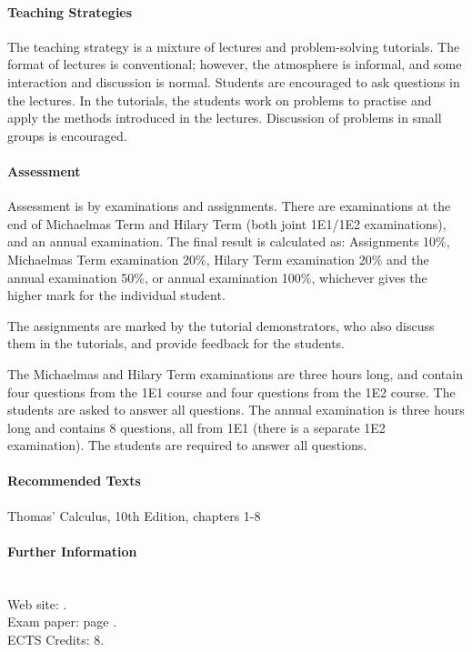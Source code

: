 \paragraph{Teaching Strategies}
The teaching strategy is a mixture of lectures and problem-solving tutorials. The format of lectures is conventional;
however, the atmosphere is informal, and some interaction and discussion is normal. Students are encouraged to ask
questions in the lectures. In the tutorials, the students work on problems to practise and apply the methods introduced
in the lectures. Discussion of problems in small groups is encouraged.

\paragraph{Assessment} Assessment is by examinations and assignments. There are examinations at the end of
Michaelmas Term and Hilary Term (both joint 1E1/1E2 examinations), and an annual examination. The final result is
calculated as: Assignments 10\%, Michaelmas Term examination 20\%, Hilary Term examination 20\% and the
annual examination 50\%, or annual examination 100\%, whichever gives the higher mark for the individual student.

The assignments are marked by the tutorial demonstrators, who also discuss them in the tutorials, and provide feedback
for the students.

The Michaelmas and Hilary Term examinations are three hours long, and contain four questions from the 1E1 course and
four questions from the 1E2 course. The students are asked to answer all questions. The annual examination is three
hours long and contains 8 questions, all from 1E1 (there is a separate 1E2 examination). The students are required
to answer all questions.

\paragraph{Recommended Texts} Thomas' Calculus, 10th Edition, chapters 1-8


\paragraph{Further Information}~\\
Web site: .\\
Exam paper: page \pageref{1E1}.\\
ECTS Credits: 8.
